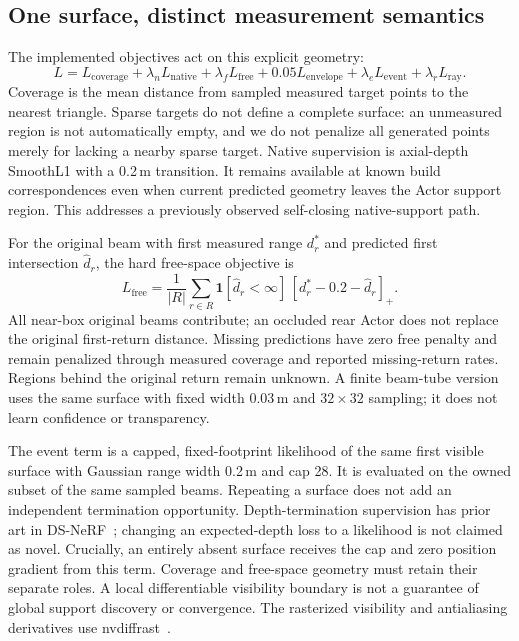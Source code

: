 \documentclass[10pt,a4paper]{article}
\begin{document}
\subsection{One surface, distinct measurement semantics}
The implemented objectives act on this explicit geometry:
\begin{equation}
 L=L_{\mathrm{coverage}}+\lambda_n L_{\mathrm{native}}
       +\lambda_f L_{\mathrm{free}}+0.05L_{\mathrm{envelope}}
       +\lambda_e L_{\mathrm{event}}+\lambda_r L_{\mathrm{ray}}.
\end{equation}
Coverage is the mean distance from sampled measured target points to the nearest
triangle. Sparse targets do not define a complete surface: an unmeasured region
is not automatically empty, and we do not penalize all generated points merely
for lacking a nearby sparse target. Native supervision is axial-depth SmoothL1
with a 0.2\,m transition. It remains available at known build correspondences
even when current predicted geometry leaves the Actor support region. This
addresses a previously observed self-closing native-support path.

For the original beam with first measured range $d_r^*$ and predicted first
intersection $\hat d_r$, the hard free-space objective is
\begin{equation}
 L_{\mathrm{free}}=\frac1{|R|}\sum_{r\in R}
 \mathbf1[\hat d_r<\infty]\,[d_r^*-0.2-\hat d_r]_+.
\end{equation}
All near-box original beams contribute; an occluded rear Actor does not replace
the original first-return distance. Missing predictions have zero free penalty
and remain penalized through measured coverage and reported missing-return
rates. Regions behind the original return remain unknown. A finite beam-tube
version uses the same surface with fixed width 0.03\,m and $32\times32$ sampling;
it does not learn confidence or transparency.

The event term is a capped, fixed-footprint likelihood of the same first visible
surface with Gaussian range width 0.2\,m and cap 28. It is evaluated on the owned
subset of the same sampled beams. Repeating a surface does not add an independent
termination opportunity. Depth-termination supervision has prior art in
DS-NeRF~\cite{dsnerf}; changing an expected-depth loss to a likelihood is not
claimed as novel. Crucially, an entirely absent surface receives the cap and
zero position gradient from this term. Coverage and free-space geometry must
retain their separate roles. A local differentiable visibility boundary is not
a guarantee of global support discovery or convergence. The rasterized
visibility and antialiasing derivatives use nvdiffrast~\cite{nvdiffrast}.
\end{document}
